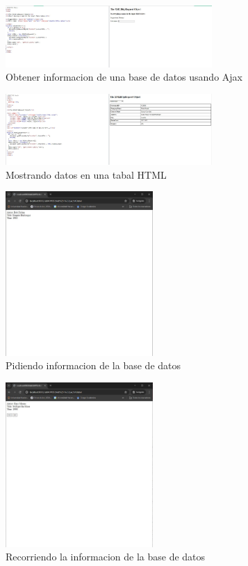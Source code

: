 \begin{figure}[H]
  \centering
  \includegraphics[width=0.7\textwidth]{img/ex8.jpg}
  \caption{Obtener informacion de una base de datos usando Ajax}
  \end{figure}

\begin{figure}[H]
  \centering
  \includegraphics[width=0.7\textwidth]{img/ex9.jpg}
  \caption{Mostrando datos en una tabal HTML}
  \end{figure}

\begin{figure}[H]
    \centering
    \includegraphics[width=0.5\textwidth]{img/ex10.jpg}
    \caption{ Pidiendo informacion de la base de datos}
    \end{figure}

\begin{figure}[H]
  \centering
  \includegraphics[width=0.5\textwidth]{img/ex11.jpg}
  \caption{Recorriendo la informacion de la base de datos}
  \end{figure}

